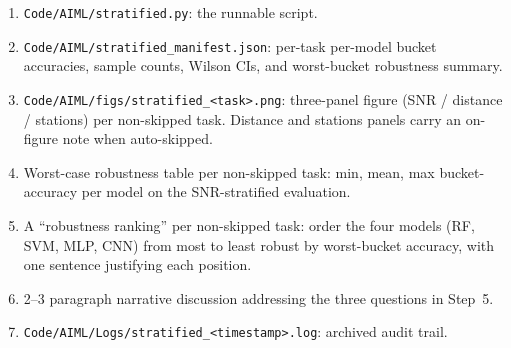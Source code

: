 \documentclass[11pt,letterpaper]{article}
\begin{document}
\begin{tcolorbox}[deliverable={Lab Handout 4-G Deliverable}]
	\begin{enumerate}[leftmargin=1.2em]
		\item \texttt{Code/AIML/stratified.py}: the runnable script.
		\item \texttt{Code/AIML/stratified\_manifest.json}: per-task per-model bucket accuracies, sample counts, Wilson CIs, and worst-bucket robustness summary.
		\item \texttt{Code/AIML/figs/stratified\_<task>.png}: three-panel figure (SNR / distance / stations) per non-skipped task. Distance and stations panels carry an on-figure note when auto-skipped.
		\item Worst-case robustness table per non-skipped task: min, mean, max bucket-accuracy per model on the SNR-stratified evaluation.
		\item A ``robustness ranking'' per non-skipped task: order the four models (RF, SVM, MLP, CNN) from most to least robust by worst-bucket accuracy, with one sentence justifying each position.
		\item 2--3 paragraph narrative discussion addressing the three questions in Step~5.
		\item \texttt{Code/AIML/Logs/stratified\_<timestamp>.log}: archived audit trail.
	\end{enumerate}
\end{tcolorbox}

\printhandoutglossary
\end{document}
